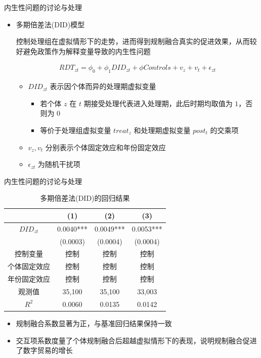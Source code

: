 \documentclass{beamer}
\begin{document}
\begin{frame}{内生性问题的讨论与处理}
    \begin{itemize}
        \item 多期倍差法(DID)模型 \\
        \begin{scriptsize}
            控制处理组在虚拟情形下的走势，进而得到规制融合真实的促进效果，从而较好避免政策作为解释变量导致的内生性问题
        \end{scriptsize}
        \begin{gather*}
            RDT_{zt}=\phi_0+\phi_1 DID_{zt}+\phi Controls+v_z+v_t+\epsilon_{zt} \tag{13}
        \end{gather*}
        \begin{itemize}
            \item $DID_{zt}$ 表示因个体而异的处理期虚拟变量
            \begin{itemize}
                \item 若个体 $z$ 在 $t$ 期接受处理代表进入处理期，此后时期均取值为 $1$，否则为 $0$
                \item 等价于处理组虚拟变量 $treat_z$ 和处理期虚拟变量 $post_t$ 的交乘项
            \end{itemize}
            \item $v_z, v_t$ 分别表示个体固定效应和年份固定效应
            \item $\epsilon_{zt}$ 为随机干扰项
        \end{itemize}
    \end{itemize}    
\end{frame}

\begin{frame}{内生性问题的讨论与处理}
    \vspace*{-1em}
    \begin{table}
        \centering
        \caption{多期倍差法(DID)的回归结果}
        \label{tab:DID_results}
        \begin{tabular}{cccc}
            \toprule
            & (1) & (2) & (3) \\
            \midrule
            $DID_{zt}$ & 0.0040*** & 0.0049*** & 0.0053*** \\
            & (0.0003) & (0.0004) & (0.0004) \\
            控制变量 & 控制 & 控制 & 控制 \\
            个体固定效应 & 控制 & 控制 & 控制 \\
            年份固定效应 & 控制 & 控制 & 控制 \\
            观测值 & 35,100 & 35,100 & 33,003 \\
            $R^{2}$ & 0.0060 & 0.0135 & 0.0142 \\
            \bottomrule
        \end{tabular}
    \end{table}
    \begin{itemize}
        \item 规制融合系数显著为正，与基准回归结果保持一致
        \item 交互项系数度量了个体规制融合后超越虚拟情形下的表现，说明规制融合促进了数字贸易的增长
    \end{itemize}
\end{frame}
\end{document}

